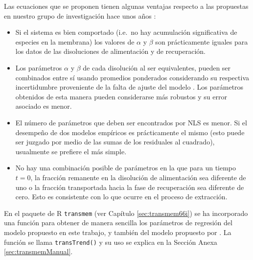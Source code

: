 Las ecuaciones que se proponen tienen algunas ventajas respecto a las propuestas en nuestro grupo de investigación hace unos años \citep{RODRIGUEZDESANMIGUEL2014}:
\begin{itemize}
    \item Si el sistema es bien comportado (i.e.\ no hay acumulación significativa de especies en la membrana) los valores de $\alpha$ y $\beta$ son prácticamente iguales para los datos de las disoluciones de alimentación y de recuperación.
    \item Los parámetros $\alpha$ y $\beta$ de cada disolución al ser equivalentes, pueden ser combinados entre sí usando promedios ponderados considerando su respectiva incertidumbre proveniente de la falta de ajuste del modelo \citep{borenstein2011}. Los parámetros obtenidos de esta manera pueden considerarse más robustos y su error asociado es menor.
    \item El número de parámetros que deben ser encontrados por \ac{NLS} es menor. Si el desempeño de dos modelos empíricos es prácticamente el mismo (esto puede ser juzgado por medio de las sumas de los residuales al cuadrado), usualmente se prefiere el más simple.
    \item No hay una combinación posible de parámetros en la que para un tiempo $t=0$, la fracción remanente en la disolución de alimentación sea diferente de uno o la fracción transportada hacia la fase de recuperación sea diferente de cero. Esto es consistente con lo que ocurre en el proceso de extracción.
\end{itemize}   



En el paquete de R \verb|transmem| (ver Capítulo \ref{sec:transmem66i}) se ha incorporado una función para obtener de manera sencilla los parámetros de regresión del modelo propuesto en este trabajo, y también del modelo propuesto por \citet{RODRIGUEZDESANMIGUEL2014}. La función se llama \verb|transTrend()| y su uso se explica en la Sección Anexa \ref{sec:transmemManual}.


